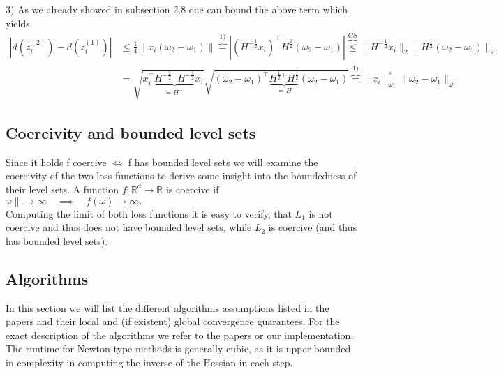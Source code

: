 \documentclass{article}
\begin{document}
3)
As we already showed in subsection 2.8 one can bound the above term which yields
\begin{align*}
  | d(z_i ^{(2)}) - d(z_i ^{(1)})| &\leq \frac{1}{4} \| x_i (\omega_2 - \omega_1)\| 
  \overbrace{=}^{1)} | (H ^ {-\frac{1}{2}}x_i) ^\top H^{\frac{1}{2}}(\omega_2 - \omega_1)|
  \overbrace{\leq}^{CS} \| H^{-\frac{1}{2}} x_i\|_{2} \| H^{\frac{1}{2}}(\omega_2 - \omega_1)\|_{2}\\
  &= \sqrt{x_i^\top \underbrace{H^{-\frac{1}{2} \top}H^{-\frac{1}{2}}}_{=H^{-1}}x_i} \sqrt{(\omega_2 - \omega_1)^\top \underbrace{H^{\frac{1}{2}\top}H^{\frac{1}{2}}}_{=H}(\omega_2 - \omega_1)} 
  \overbrace{=}^{1)} \|x_i\|_{\omega _1}^* \|\omega_2-\omega_1\|_{\omega_1}
\end{align*}

\subsection{Coercivity and bounded level sets}
Since it holds f coercive $\Longleftrightarrow$ f has bounded level sets we will examine the coercivity of the two loss functions to derive some insight into the boundedness of their level sets. A function $f : \mathbb{R}^d \to \mathbb{R}$ is coercive if $\omega \| \to \infty \quad \implies \quad f(\omega) \to \infty. $\\
Computing the limit of both loss functions it is easy to verify, that $L_1$ is not coercive and thus does not have bounded level sets, while $L_2$ is coercive (and thus has bounded level sets).

\subsection*{Algorithms}
In this section we will list the different algorithms assumptions listed in the papers and their local and (if existent) global convergence guarantees. For the exact description of the algorithms we refer to the papers or our implementation. The runtime for Newton-type methods is generally cubic, as it is upper bounded in complexity in computing the inverse of the Hessian in each step.
\end{document}
